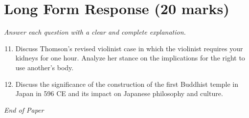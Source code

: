 \documentclass[12pt]{article}
\begin{document}
\section*{Long Form Response (20 marks)}
\textit{Answer each question with a clear and complete explanation.}
\begin{enumerate}[label=\arabic*.]
\setcounter{enumi}{10}
\item Discuss Thomson's revised violinist case in which the violinist requires your kidneys for one hour. Analyze her stance on the implications for the right to use another's body.
\item Discuss the significance of the construction of the first Buddhist temple in Japan in 596 CE and its impact on Japanese philosophy and culture.
\end{enumerate}

\vfill
\noindent\textit{End of Paper}
\end{document}

